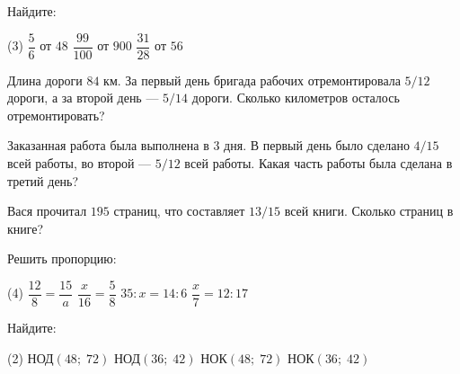 \begin{homework}[number=1]
	\begin{listofex}
	\item Найдите:
	\begin{tasks}(3)
		\task \( \dfrac{5}{6} \) от \( 48 \)
		\task \( \dfrac{99}{100} \) от \( 900 \)
		\task \( \dfrac{31}{28} \) от \( 56 \)
	\end{tasks}
	\item Длина дороги \( 84 \) км. За первый день бригада рабочих отремонтировала \( 5/12 \) дороги, а за второй день --- \( 5/14 \) дороги. Сколько километров осталось отремонтировать?
	\item Заказанная работа была выполнена в \( 3 \) дня. В первый день было сделано \( 4/15 \) всей работы, во второй --- \( 5/12 \) всей работы. Какая часть работы была сделана в третий день?
	\item Вася прочитал \( 195 \) страниц, что составляет \( 13/15 \) всей книги. Сколько страниц в книге?
	\item Решить пропорцию:
	\begin{tasks}(4)
		\task \( \dfrac{12}{8}=\dfrac{15}{a} \)
		\task \( \dfrac{x}{16}=\dfrac{5}{8} \)
		\task \( 35:x=14:6 \)
		\task \( \dfrac{x}{7}=12:17 \)
	\end{tasks}
	\item Найдите:
	\begin{tasks}(2)
		\task НОД\( (48;\;72) \)
		\task НОД\( (36;\;42) \)
		\task НОК\( (48;\;72) \)
		\task НОК\( (36;\;42) \)
	\end{tasks}
	\end{listofex}
\end{homework}


